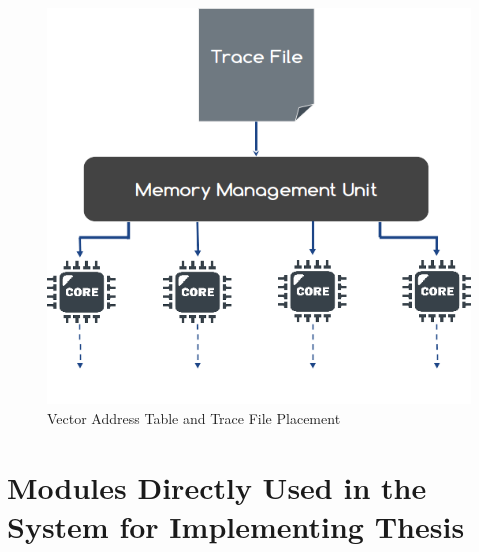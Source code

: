 \documentclass{listhesis}
\begin{document}
\begin{figure}[h!]
  \includegraphics[width=0.7\linewidth]{traceFile.png}
  \centering
  \caption{Vector Address Table and Trace File Placement}
  \label{fig:traceFile}
\end{figure}
\section{Modules Directly Used in the System for Implementing Thesis}
\end{document}
